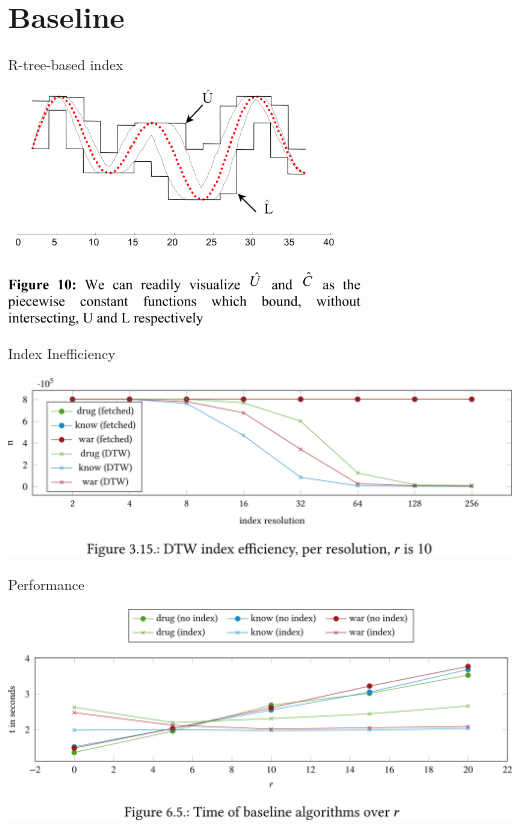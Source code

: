 \documentclass[14pt,t]{beamer}
\begin{document}
\section{Baseline}
\begin{frame}[c]{R-tree-based index}
    \begin{center}
        \includegraphics[width = 0.7\textwidth]{img/bib-lb_keogh}
    \end{center}

    \vspace{\baselineskip}

\end{frame}
\begin{frame}[c]{Index Inefficiency}
    \begin{center}
        \includegraphics[width = \textwidth]{img/baseline}
    \end{center}
\end{frame}
\begin{frame}[c]{Performance}
    \begin{center}
        \includegraphics[width = \textwidth]{img/perf-baseline}
    \end{center}
\end{frame}
\end{document}
